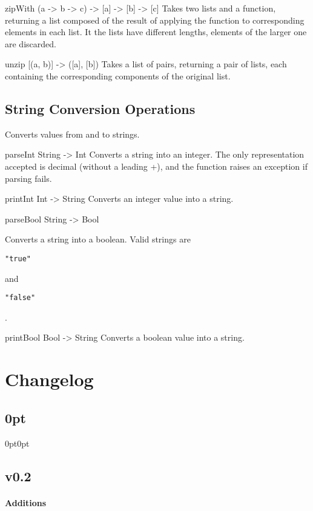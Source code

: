 \documentclass{article}
\def\code#1{\begin{footnotesize}\texttt{#1}\end{footnotesize}}
\begin{document}
\libfunction
  {zipWith}
  {(a -> b -> c) -> [a] -> [b] -> [c]}
  {Takes two lists and a function, returning a list composed of the result of applying the function to corresponding elements in each list. It the lists have different lengths, elements of the larger one are discarded.}

\libfunction
  {unzip}
  {[(a, b)] -> ([a], [b])}
  {Takes a list of pairs, returning a pair of lists, each containing the corresponding components of the original list.}

\subsection{String Conversion Operations}

Converts values from and to strings.

\medskip

\libfunction
  {parseInt}
  {String -> Int}
  {Converts a string into an integer. The only representation accepted is decimal (without a leading +), and the function raises an exception if parsing fails.}

\libfunction
  {printInt}
  {Int -> String}
  {Converts an integer value into a string.}

\libfunction
  {parseBool}
  {String -> Bool}
  {Converts a string into a boolean. Valid strings are \code{"true"} and \code{"false"}.}

\libfunction
  {printBool}
  {Bool -> String}
  {Converts a boolean value into a string.}

\section{Changelog}

\titlespacing\subsection{0pt}{0pt}{0pt}

\subsection*{v0.2}
{\small{}}

\paragraph{\large Additions}
\end{document}

